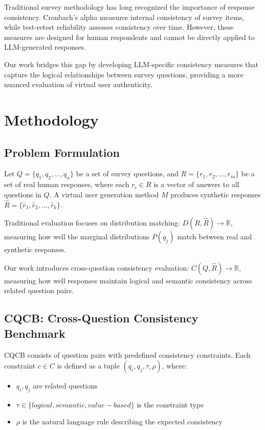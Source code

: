 \documentclass[sigconf, anonymous]{acmart}
\begin{document}
Traditional survey methodology has long recognized the importance of response consistency. Cronbach's alpha \citep{cronbach1951coefficient} measures internal consistency of survey items, while test-retest reliability \citep{nunnally1978psychometric} assesses consistency over time. However, these measures are designed for human respondents and cannot be directly applied to LLM-generated responses.

Our work bridges this gap by developing LLM-specific consistency measures that capture the logical relationships between survey questions, providing a more nuanced evaluation of virtual user authenticity.

\section{Methodology}

\subsection{Problem Formulation}

Let $Q = \{q_1, q_2, ..., q_n\}$ be a set of survey questions, and $R = \{r_1, r_2, ..., r_m\}$ be a set of real human responses, where each $r_i \in R$ is a vector of answers to all questions in $Q$. A virtual user generation method $M$ produces synthetic responses $\hat{R} = \{\hat{r}_1, \hat{r}_2, ..., \hat{r}_k\}$.

Traditional evaluation focuses on distribution matching: $D(R, \hat{R}) \rightarrow \mathbb{R}$, measuring how well the marginal distributions $P(q_j)$ match between real and synthetic responses.

Our work introduces cross-question consistency evaluation: $C(Q, \hat{R}) \rightarrow \mathbb{R}$, measuring how well responses maintain logical and semantic consistency across related question pairs.

\subsection{CQCB: Cross-Question Consistency Benchmark}

CQCB consists of question pairs with predefined consistency constraints. Each constraint $c \in C$ is defined as a tuple $(q_i, q_j, \tau, \rho)$, where:

\begin{itemize}
    \item $q_i, q_j$ are related questions
    \item $\tau \in \{logical, semantic, value-based\}$ is the constraint type
    \item $\rho$ is the natural language rule describing the expected consistency
\end{itemize}
\end{document}
